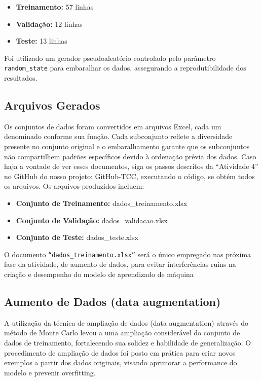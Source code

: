 \begin{itemize}
    \item \textbf{Treinamento:} 57 linhas
    \item \textbf{Validação:} 12 linhas
    \item \textbf{Teste:} 13 linhas
\end{itemize}

Foi utilizado um gerador pseudoaleatório controlado pelo parâmetro \texttt{random\_state} para embaralhar os dados, assegurando a reprodutibilidade dos resultados.

\subsection*{Arquivos Gerados}
Os conjuntos de dados foram convertidos em arquivos Excel, cada um denominado conforme sua função. Cada subconjunto reflete a diversidade presente no conjunto original e o embaralhamento garante que os subconjuntos não compartilhem padrões específicos devido à ordenação prévia dos dados. Caso haja a vontade de ver esses documentos, siga os passos descritos da “Atividade 4” no GitHub do nosso projeto: GitHub-TCC, executando o código, se obtém todos os arquivos. Os arquivos produzidos incluem:


\begin{itemize}
    \item \textbf{Conjunto de Treinamento:} dados\_treinamento.xlsx


    \item \textbf{Conjunto de Validação:} dados\_validacao.xlsx



    \item \textbf{Conjunto de Teste:} dados\_teste.xlsx

\end{itemize}

O documento \texttt{“dados\_treinamento.xlsx”} será o único empregado nas próxima fase da atividade, de aumento de dados, para evitar interferências ruins na criação e desempenho do modelo de aprendizado de máquina \cite{kiar2021}

\subsection*{Aumento de Dados (data augmentation)}
A utilização da técnica de ampliação de dados (data augmentation) através do método de Monte Carlo levou a uma ampliação considerável do conjunto de dados de treinamento, fortalecendo sua solidez e habilidade de generalização. O procedimento de ampliação de dados foi posto em prática para criar novos exemplos a partir dos dados originais, visando aprimorar a performance do modelo e prevenir overfitting.

